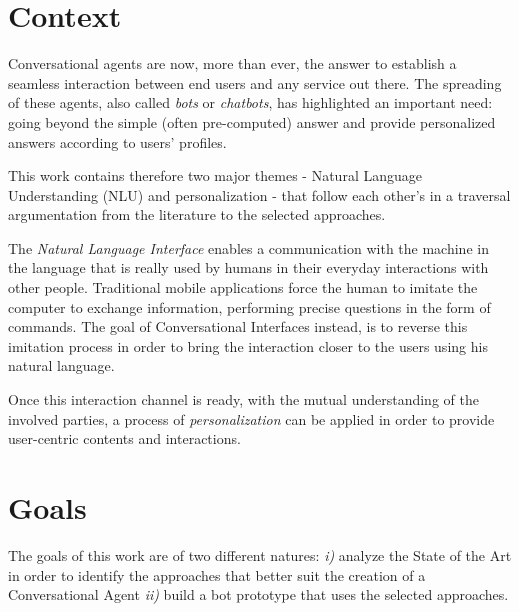 



\section*{Context}
Conversational agents are now, more than ever, the answer to establish a seamless interaction between end users and any service out there. The spreading of these agents, also called \textit{bots} or \textit{chatbots}, has highlighted an important need: going beyond the simple (often pre-computed) answer and provide personalized answers according to users' profiles.

This work contains therefore two major themes - Natural Language Understanding (NLU) and personalization - that follow each other's in a traversal argumentation from the literature to the selected approaches.

The \textit{Natural Language Interface} enables a communication with the machine in the language that is really used by humans in their everyday interactions with other people. Traditional mobile applications force the human to imitate the computer to exchange information, performing precise questions in the form of commands. The goal of Conversational Interfaces instead, is to reverse this imitation process in order to bring the interaction closer to the users using his natural language.

Once this interaction channel is ready, with the mutual understanding of the involved parties, a process of \textit{personalization} can be applied in order to provide user-centric contents and interactions.

\section*{Goals}
The goals of this work are of two different natures: \textit{i)} analyze the State of the Art in order to identify the approaches that better suit the creation of a Conversational Agent \textit{ii)} build a bot prototype that uses the selected approaches.

